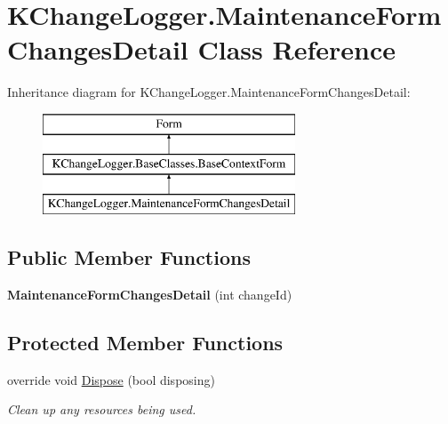 \hypertarget{class_k_change_logger_1_1_maintenance_form_changes_detail}{\section{K\-Change\-Logger.\-Maintenance\-Form\-Changes\-Detail Class Reference}
\label{class_k_change_logger_1_1_maintenance_form_changes_detail}
}
Inheritance diagram for K\-Change\-Logger.\-Maintenance\-Form\-Changes\-Detail\-:\begin{figure}[H]
\begin{center}
\leavevmode
\includegraphics[height=3.000000cm]{class_k_change_logger_1_1_maintenance_form_changes_detail}
\end{center}
\end{figure}
\subsection*{Public Member Functions}
\begin{DoxyCompactItemize}
\item 
\hypertarget{class_k_change_logger_1_1_maintenance_form_changes_detail_a5dbfdd536c9d75f317a455861abc5836}{{\bfseries Maintenance\-Form\-Changes\-Detail} (int change\-Id)}\label{class_k_change_logger_1_1_maintenance_form_changes_detail_a5dbfdd536c9d75f317a455861abc5836}

\end{DoxyCompactItemize}
\subsection*{Protected Member Functions}
\begin{DoxyCompactItemize}
\item 
override void \hyperlink{class_k_change_logger_1_1_maintenance_form_changes_detail_a8a7eaf671c7936363e46634cbf8c066b}{Dispose} (bool disposing)
\begin{DoxyCompactList}\small\item\em Clean up any resources being used. \end{DoxyCompactList}\end{DoxyCompactItemize}
